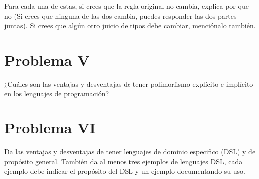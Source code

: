 \documentclass{article}
\begin{document}
Para cada una de estas, si crees que la regla original no cambia, explica por que no
(Si crees que ninguna de las dos cambia, puedes responder las dos partes juntas).
Si crees que algún otro juicio de tipos debe cambiar, menciónalo también.

\section*{Problema V}
¿Cuáles son las ventajas y desventajas de tener polimorfismo explícito e implícito
en los lenguajes de programación?

\section*{Problema VI}
Da las ventajas y desventajas de tener lenguajes de dominio especifico (DSL)
y de propósito general. También da al menos tres ejemplos de lenguajes DSL,
cada ejemplo debe indicar el propósito del DSL y un ejemplo documentando su uso.
\end{document}
